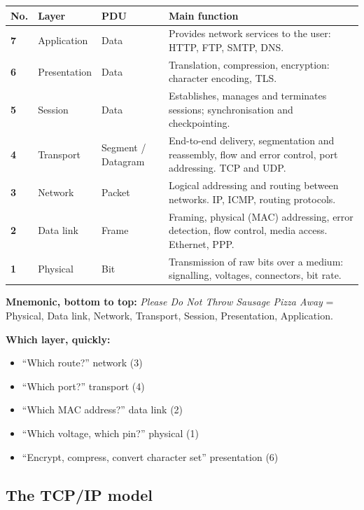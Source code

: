 \documentclass[11pt,a4paper]{article}
\begin{document}
\begin{center}\small
\begin{tabularx}{\textwidth}{>{\bfseries}p{} p{} p{} X}
\toprule No. & Layer & PDU & Main function\\
\midrule
7 & Application & Data & Provides network services to the user: HTTP, FTP, SMTP, DNS.\\
6 & Presentation & Data & Translation, compression, encryption: character encoding, TLS.\\
5 & Session & Data & Establishes, manages and terminates sessions; synchronisation and checkpointing.\\
4 & Transport & Segment / Datagram & End-to-end delivery, segmentation and reassembly, flow and error control, port addressing. TCP and UDP.\\
3 & Network & Packet & Logical addressing and routing between networks. IP, ICMP, routing protocols.\\
2 & Data link & Frame & Framing, physical (MAC) addressing, error detection, flow control, media access. Ethernet, PPP.\\
1 & Physical & Bit & Transmission of raw bits over a medium: signalling, voltages, connectors, bit rate.\\
\bottomrule
\end{tabularx}
\end{center}

\begin{rememberbox}
\textbf{Mnemonic, bottom to top:} \emph{Please Do Not Throw Sausage Pizza Away} = Physical, Data link, Network, Transport, Session, Presentation, Application.

\textbf{Which layer, quickly:}
\begin{itemize}
\item ``Which route?'' \textrightarrow{} network (3)
\item ``Which port?'' \textrightarrow{} transport (4)
\item ``Which MAC address?'' \textrightarrow{} data link (2)
\item ``Which voltage, which pin?'' \textrightarrow{} physical (1)
\item ``Encrypt, compress, convert character set'' \textrightarrow{} presentation (6)
\end{itemize}
\end{rememberbox}

\subsection{The TCP/IP model}
\end{document}
